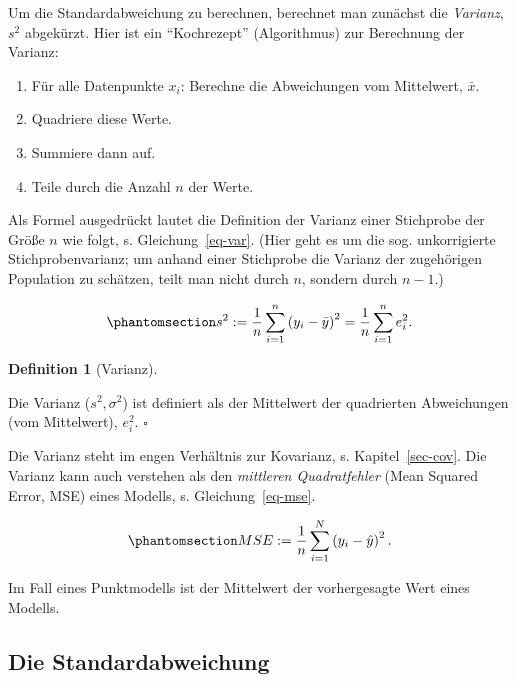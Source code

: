 \documentclass[
  letterpaper,
  twoside,
  open=any]{scrbook}
\providecommand{\tightlist}{%
  \setlength{\itemsep}{0pt}\setlength{\parskip}{0pt}}\usepackage{longtable,booktabs,array}
\theoremstyle{definition}
\theoremstyle{definition}
\theoremstyle{definition}
\newtheorem{definition}{Definition}[chapter]
\theoremstyle{remark}
\begin{document}
Um die Standardabweichung zu berechnen, berechnet man zunächst die
\emph{Varianz}, \(s^2\) abgekürzt. Hier ist ein \enquote{Kochrezept}
(Algorithmus) zur Berechnung der Varianz:

\begin{enumerate}
\def\labelenumi{\arabic{enumi}.}
\tightlist
\item
  Für alle Datenpunkte \(x_i\): Berechne die Abweichungen vom
  Mittelwert, \(\bar{x}\).
\item
  Quadriere diese Werte.
\item
  Summiere dann auf.
\item
  Teile durch die Anzahl \(n\) der Werte.
\end{enumerate}

Als Formel ausgedrückt lautet die Definition der Varianz einer
Stichprobe der Größe \(n\) wie folgt, s. Gleichung~\ref{eq-var}. (Hier
geht es um die sog. unkorrigierte Stichprobenvarianz; um anhand einer
Stichprobe die Varianz der zugehörigen Population zu schätzen, teilt man
nicht durch \(n\), sondern durch \(n-1\).)

\begin{equation}\phantomsection\label{eq-var}{{\displaystyle s^{2}:={\frac {1}{n}}\sum _{i=1}^{n}\left(y_{i}-{\bar {y}}\right)^{2}={\frac {1}{n}}\sum _{i=1}^{n}e_i^{2}.}}\end{equation}

\begin{definition}[Varianz]\protect\hypertarget{def-var}{}\label{def-var}

Die Varianz (\(s^2, \sigma^2\)) ist definiert als der Mittelwert der
quadrierten Abweichungen (vom Mittelwert), \(e_i^2\). \(\square\)

\end{definition}

Die Varianz steht im engen Verhältnis zur Kovarianz, s.
Kapitel~\ref{sec-cov}. Die Varianz kann auch verstehen als den
\emph{mittleren Quadratfehler} (Mean Squared Error, MSE) eines Modells,
s. Gleichung~\ref{eq-mse}.

\begin{equation}\phantomsection\label{eq-mse}{{\displaystyle MSE:={\frac {1}{n}}\sum _{i=1}^{N}\left(y_{i}-{\hat {y}}\right)^{2}.}}\end{equation}

Im Fall eines Punktmodells ist der Mittelwert der vorhergesagte Wert
eines Modells.

\subsection{Die Standardabweichung}\label{die-standardabweichung}
\end{document}
